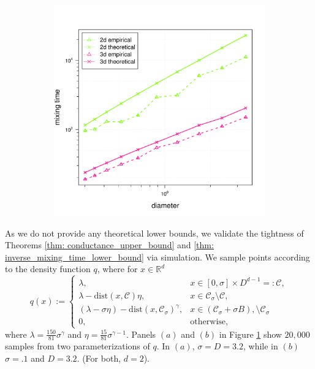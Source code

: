 \documentclass{article}
\newcommand{\Reals}{\mathbb{R}}
\newcommand{\Rd}{\Reals^d}
\newcommand{\1}{\mathbf{1}}
\newcommand{\dist}{\mathrm{dist}}
\newcommand{\Cset}{\mathcal{C}}
\newcommand{\Csig}{\Cset_{\sigma}}
\theoremstyle{aldenthm}
\theoremstyle{aldenrmrk}
\begin{document}
\begin{figure}
\begin{adjustbox}{minipage=\linewidth,scale=0.8}
\begin{subfigure}{.33\linewidth}
		\caption{}
	\end{subfigure}
	\begin{subfigure}{.33\linewidth}
		\includegraphics[width=\linewidth]{example1plots/diameter_mixing_time_plot}
		\caption{}
	\end{subfigure}
	\caption{}
	\label{fig:fig1}
	\end{adjustbox}
\end{figure}

As we do not provide any theoretical lower bounds, we validate the tightness of Theorems \ref{thm: conductance_upper_bound} and \ref{thm: inverse_mixing_time_lower_bound} via simulation.  We sample points according to the density function $q$, where for $x \in \Rd$
\begin{equation}
q(x) :=
\begin{cases}
\lambda,~ & x \in [0,\sigma] \times D^{d-1} =: \Cset, \\
\lambda - \dist(x,\Cset)\eta,~ & x \in \Csig \setminus \Cset, \\
(\lambda - \sigma \eta) - \dist(x,\Csig)^{\gamma}, & x \in (\Csig + \sigma B), \setminus \Csig \\
0,~ & \textrm{otherwise},
\end{cases}
\end{equation}
where $\lambda = \frac{150}{81} \sigma^{\gamma}$ and $\eta = \frac{15}{81} \sigma^{\gamma - 1}$. Panels $(a)$ and $(b)$ in Figure \ref{fig:fig1} show $20,000$ samples from two parameterizations of $q$. In $(a)$, $\sigma = D = 3.2$, while in $(b)$ $\sigma = .1$ and $D = 3.2$. (For both, $d = 2$).
\end{document}
